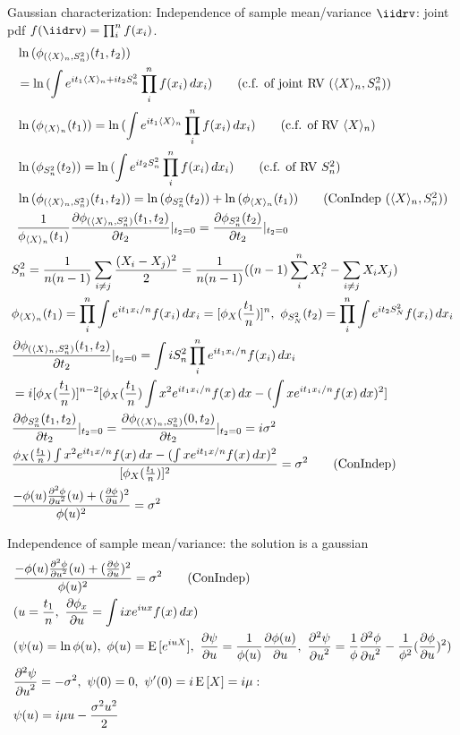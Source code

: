 \documentclass[asd-beamer.tex]{subfiles}%
\begin{document}
\begin{frame}{Gaussian characterization: Independence of sample mean/variance}
	$\iidrv$: joint pdf $f(\iidrv)=\prod_i^nf(x_i)$.
	\begin{align*}
	&\ln{(\phi_{(\exv{X}_n,S_n^2)}(t_1,t_2))}\\
	&=\ln{(\int\exp{it_1\exv{X}_n+it_2S_n^2}\prod_i^nf(x_i)\,dx_i)}\tag{c.f. of joint RV $(\exv{X}_n,S_n^2)$}\\
	&\ln{(\phi_{\exv{X}_n}(t_1))}=\ln{(\int\exp{it_1\exv{X}_n}\prod_i^nf(x_i)\,dx_i)}\tag{c.f. of RV $\exv{X}_n$}\\
	&\ln{(\phi_{S_n^2}(t_2))}=\ln{(\int\exp{it_2S_n^2}\prod_i^nf(x_i)\,dx_i)}\tag{c.f. of RV $S_n^2$}\\
	&\ln{(\phi_{(\exv{X}_n,S_n^2)}(t_1,t_2))}=\ln{(\phi_{S_n^2}(t_2))}+\ln{(\phi_{\exv{X}_n}(t_1))}\tag{ConIndep ($\exv{X}_n, S_n^2$)}\\
	&\frac{1}{\phi_{\exv{X}_n}(t_1)}\PDy{t_2}{\phi_{(\exv{X}_n,S_n^2)}(t_1,t_2)}|_{t_2=0}=\PDy{t_2}{\phi_{S_n^2}(t_2)}|_{t_2=0}
	\end{align*}
	\begin{align*}
	&S_n^2=\frac{1}{n(n-1)}\sum_{i\neq j}\frac{(X_i-X_j)^2}{2}=\frac{1}{n(n-1)}((n-1)\sum_i^nX_i^2-\sum_{i\neq j}X_iX_j)\\
    &\phi_{\exv{X}_n}(t_1)=\prod_i^n\int\exp{it_1x_i/n}f(x_i)\,dx_i=[\phi_X(\frac{t_1}{n})]^n,\ \phi_{S_N^2}(t_2)=\prod_i^n\int\exp{it_2S_N^2}f(x_i)\,dx_i\\
	&\PDy{t_2}{\phi_{(\exv{X}_n,S_n^2)}(t_1,t_2)}|_{t_2=0}=\int iS_n^2\prod_i^n\exp{it_1x_i/n}f(x_i)\,dx_i\\
	&=i[\phi_X(\frac{t_1}{n})]^{n-2}[\phi_X(\frac{t_1}{n})\int x^2\exp{it_1x_i/n}f(x)\,dx-(\int x\exp{it_1x_i/n}f(x)\,dx)^2]\\
	&\PDy{t_2}{\phi_{S_n^2}(t_1,t_2)}|_{t_2=0}=\PDy{t_2}{\phi_{(\exv{X}_n,S_n^2)}(0,t_2)}|_{t_2=0}=i\sigma^2\\
	&\frac{\phi_X(\frac{t_1}{n})\int x^2\exp{it_1x/n}f(x)\,dx-(\int x\exp{it_1x/n}f(x)\,dx)^2}{[\phi_X(\frac{t_1}{n})]^2}=\sigma^2\tag{ConIndep}\\
	&\frac{-\phi(u)\PtwoDy{u}{\phi}(u)+(\PDy{u}{\phi})^2}{\phi(u)^2}=\sigma^2
	\end{align*}%
\end{frame}

\begin{frame}{Independence of sample mean/variance: the solution is a gaussian}
    \begin{align*}
        &\frac{-\phi(u)\PtwoDy{u}{\phi}(u)+(\PDy{u}{\phi})^2}{\phi(u)^2}=\sigma^2\tag{ConIndep}\\
	&(u=\frac{t_1}{n},\ \PDy{u}{\phi_x}=\int ix\exp{iux}f(x)\,dx)\\
	&(\psi(u)=\ln{\phi(u)},\ \phi(u)=\E{[\exp{iuX}]},\ \PDy{u}{\psi}=\frac{1}{\phi(u)}\PDy{u}{\phi(u)},\ \PtwoDy{u}{\psi}=\frac{1}{\phi}\PtwoDy{u}{\phi}-\frac{1}{\phi^2}(\PDy{u}{\phi})^2)\\
	&\PtwoDy{u}{\psi}=-\sigma^2,\ \psi(0)=0,\ \psi'(0)=i\E{[X]}=i\mu:\\
	&\psi(u)=i\mu u-\frac{\sigma^2u^2}{2}
	\end{align*}
\end{frame}
\end{document}
